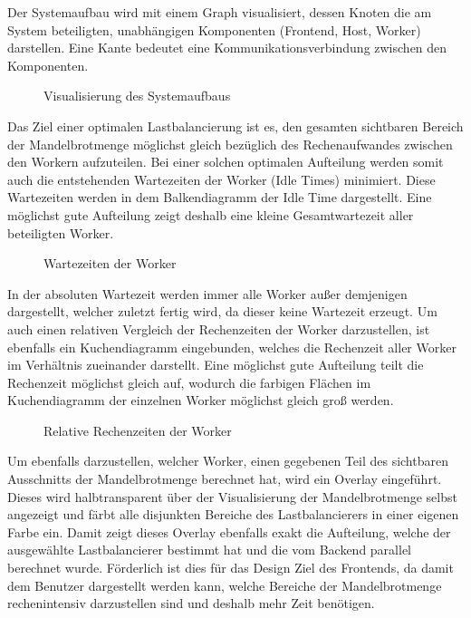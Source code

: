 Der Systemaufbau wird mit einem Graph visualisiert, dessen Knoten die am System beteiligten, unabhängigen Komponenten (Frontend, Host, Worker) darstellen. Eine Kante bedeutet eine Kommunikationsverbindung zwischen den Komponenten. 

\begin{figure}
    \centering
        \caption{Visualisierung des Systemaufbaus}
    \label{fig:visualisierung_systemaufbau}
\end{figure}

Das Ziel einer optimalen Lastbalancierung ist es, den gesamten sichtbaren Bereich der Mandelbrotmenge möglichst gleich bezüglich des Rechenaufwandes zwischen den Workern aufzuteilen. Bei einer solchen optimalen Aufteilung werden somit auch die entstehenden Wartezeiten der Worker (Idle Times) minimiert. Diese Wartezeiten werden in dem Balkendiagramm der Idle Time dargestellt. Eine möglichst gute Aufteilung zeigt deshalb eine kleine Gesamtwartezeit aller beteiligten Worker.

\begin{figure}
    \centering
        \caption{Wartezeiten der Worker}
    \label{fig:visualisierung_wartezeiten_worker}
\end{figure}

In der absoluten Wartezeit werden immer alle Worker außer demjenigen dargestellt, welcher zuletzt fertig wird, da dieser keine Wartezeit erzeugt. Um auch einen relativen Vergleich der Rechenzeiten der Worker darzustellen, ist ebenfalls ein Kuchendiagramm eingebunden, welches die Rechenzeit aller Worker im Verhältnis zueinander darstellt. Eine möglichst gute Aufteilung teilt die Rechenzeit möglichst gleich auf, wodurch die farbigen Flächen im Kuchendiagramm der einzelnen Worker möglichst gleich groß werden.

\begin{figure}
    \centering
        \caption{Relative Rechenzeiten der Worker}
    \label{fig:visualisierung_relative_rechenzeiten_worker}
\end{figure}

Um ebenfalls darzustellen, welcher Worker, einen gegebenen Teil des sichtbaren Ausschnitts der Mandelbrotmenge berechnet hat, wird ein Overlay eingeführt. Dieses wird halbtransparent über der Visualisierung der Mandelbrotmenge selbst angezeigt und färbt alle disjunkten Bereiche des Lastbalancierers in einer eigenen Farbe ein. Damit zeigt dieses Overlay ebenfalls exakt die Aufteilung, welche der ausgewählte Lastbalancierer bestimmt hat und die vom Backend parallel berechnet wurde. Förderlich ist dies für das Design Ziel des Frontends, da damit dem Benutzer dargestellt werden kann, welche Bereiche der Mandelbrotmenge rechenintensiv darzustellen sind und deshalb mehr Zeit benötigen.

